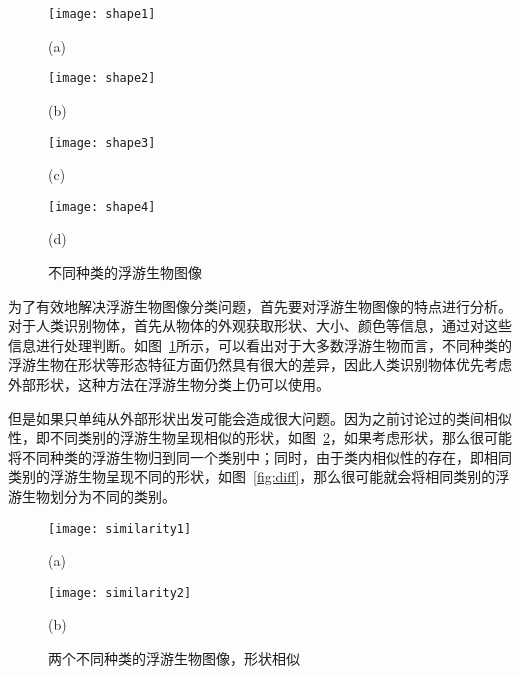 \begin{figure}[H]
\centering
\begin{minipage}[b]{0.45\linewidth} 
      \centering 
      \texttt{[image: shape1]}
        \centerline{(a) }\medskip
\end{minipage}
  \begin{minipage}[b]{0.45\linewidth}
    \centering
    \texttt{[image: shape2]}
      \centerline{(b) }\medskip
  \end{minipage}
    \begin{minipage}[b]{0.45\linewidth}
    \centering
    \texttt{[image: shape3]}
      \centerline{(c) }\medskip
  \end{minipage}
  \begin{minipage}[b]{0.45\linewidth}
    \centering
    \texttt{[image: shape4]}
      \centerline{(d) }\medskip
  \end{minipage}
 \caption{不同种类的浮游生物图像}
\label{fig:plankton}
\end{figure}

为了有效地解决浮游生物图像分类问题，首先要对浮游生物图像的特点进行分析。对于人类识别物体，首先从物体的外观获取形状、大小、颜色等信息，通过对这些信息进行处理判断。如图~\ref{fig:plankton}所示，可以看出对于大多数浮游生物而言，不同种类的浮游生物在形状等形态特征方面仍然具有很大的差异，因此人类识别物体优先考虑外部形状，这种方法在浮游生物分类上仍可以使用。

但是如果只单纯从外部形状出发可能会造成很大问题。因为之前讨论过的类间相似性，即不同类别的浮游生物呈现相似的形状，如图~\ref{fig:similarity}，如果考虑形状，那么很可能将不同种类的浮游生物归到同一个类别中；同时，由于类内相似性的存在，即相同类别的浮游生物呈现不同的形状，如图~\ref{fig:diff}，那么很可能就会将相同类别的浮游生物划分为不同的类别。

\begin{figure}[H]
\centering
\begin{minipage}[]{0.42\linewidth} 
      \centering 
      \texttt{[image: similarity1]}
        \centerline{(a) }\medskip
\end{minipage}
  \begin{minipage}[]{0.42\linewidth}
    \centering
    \texttt{[image: similarity2]}
      \centerline{(b) }\medskip
  \end{minipage}
 \caption{两个不同种类的浮游生物图像，形状相似}
\label{fig:similarity}
\end{figure}

